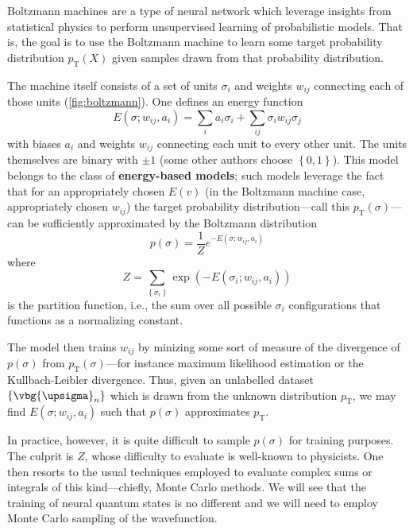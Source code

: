 \documentclass{article}
\begin{document}
Boltzmann machines are a type of neural network which leverage insights from 
statistical physics to perform unsupervised learning of probabilistic models. 
That is, the goal is to use the Boltzmann machine to learn some target 
probability distribution $ p_{\text{T}}(X) $ given samples drawn from that 
probability distribution. 

The machine itself consists of a set of units $ \sigma_i $ and weights $ w_{ij} $
connecting each of those units (\cref{fig:boltzmann}). One defines an energy 
function 
\begin{equation}
	E(\sigma; w_{ij}, a_i) = \sum_i a_i \sigma_i + \sum_{ij} \sigma_i w_{ij} \sigma_j
\end{equation}
with biases $ a_i $ and weights $ w_{ij} $ connecting each unit to every other 
unit. The units themselves are binary with $ \pm 1 $ (some other authors choose $ 
\left\{0,1\right\} $). This model belongs to the class of \textbf{energy-based 
models}; such models leverage the fact that for an appropriately chosen 
$ E(v) $ (in the Boltzmann machine case, appropriately chosen $ w_{ij} $)
the target probability distribution---call this $ p_{\text{T}}(\sigma) $---can be
sufficiently approximated by the Boltzmann distribution
\begin{equation*}\label{eq:boltzmann-machine-distribution}
	p(\sigma) = \frac{1}{Z} e^{-E(\sigma; w_{ij}, a_i)}
\end{equation*}
where 
\begin{equation*}
	Z = \sum_{\left\{\sigma_i\right\}} \exp(-E (\sigma_i; w_{ij}, a_i))
\end{equation*}
is the partition function, i.e., the sum over all possible $ \sigma_i $ 
configurations that functions as a normalizing constant.

The model then trains $ w_{ij} $ by minizing some sort of measure of the 
divergence of $ p(\sigma) $ from $ p_{\text{T}}(\sigma) $---for instance 
maximum likelihood estimation or the Kullbach-Leibler divergence. Thus, given 
an unlabelled dataset $ \left\{\vbg{\upsigma}_n\right\} $ which is drawn 
from the unknown distribution $ p_{\text{T}} $, we may find $ E(\sigma; w_{ij},
a_i) $ such that $ p(\sigma) $ approximates $ p_{\text{T}} $. 

In practice, however, it is quite difficult to sample $ p(\sigma) $ for 
training purposes. The culprit is $ Z $, whose difficulty to evaluate is
well-known to physicists. One then resorts to the usual techniques employed 
to evaluate complex sums or integrals of this kind---chiefly, Monte Carlo
methods. We will see that the training of neural quantum states is no
different and we will need to employ Monte Carlo sampling of the wavefunction.
\end{document}
